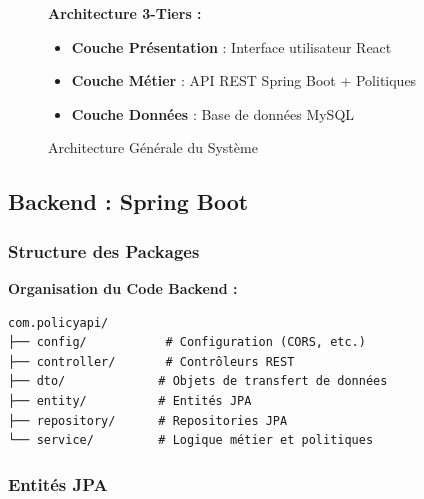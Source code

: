 \documentclass[12pt,a4paper]{article}
\begin{document}
    \begin{figure}[H]
        \centering
        \begin{tcolorbox}[colback=primaryblue!5,colframe=primaryblue,width=0.9\textwidth]
            \textbf{Architecture 3-Tiers :}
            \begin{itemize}
                \item \textbf{Couche Présentation} : Interface utilisateur React
                \item \textbf{Couche Métier} : API REST Spring Boot + Politiques
                \item \textbf{Couche Données} : Base de données MySQL
            \end{itemize}
        \end{tcolorbox}
        \caption{Architecture Générale du Système}
    \end{figure}

    \subsection{Backend : Spring Boot}

    \subsubsection{Structure des Packages}

    \begin{codebox}
        \textbf{Organisation du Code Backend :}
        \begin{lstlisting}
com.policyapi/
├── config/           # Configuration (CORS, etc.)
├── controller/       # Contrôleurs REST
├── dto/             # Objets de transfert de données
├── entity/          # Entités JPA
├── repository/      # Repositories JPA
└── service/         # Logique métier et politiques
        \end{lstlisting}
    \end{codebox}

    \subsubsection{Entités JPA}
\end{document}
